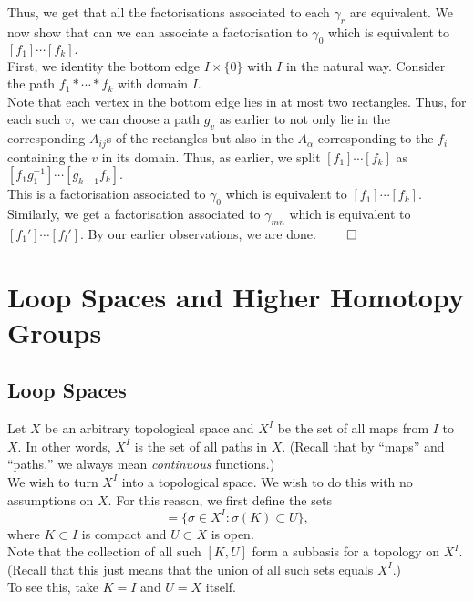 \documentclass[12pt]{article}
\begin{document}
	Thus, we get that all the factorisations associated to each $\gamma_r$ are equivalent. We now show that can we can associate a factorisation to $\gamma_0$ which is equivalent to $[f_1]\cdots[f_k].$\\
	First, we identity the bottom edge $I\times\{0\}$ with $I$ in the natural way. Consider the path $f_1*\cdots*f_k$ with domain $I.$\\
	Note that each vertex in the bottom edge lies in at most two rectangles. Thus, for each such $v,$ we can choose a path $g_v$ as earlier to not only lie in the corresponding $A_{ij}$s of the rectangles but also in the $A_\alpha$ corresponding to the $f_i$ containing the $v$ in its domain. Thus, as earlier, we split $[f_1]\cdots[f_k]$ as $[f_1g_1^{-1}]\cdots[g_{k-1}f_k].$\\
	This is a factorisation associated to $\gamma_0$ which is equivalent to $[f_1]\cdots[f_k].$\\
	Similarly, we get a factorisation associated to $\gamma_{mn}$ which is equivalent to $\allowbreak[f_1']\cdots[f_l'].$ By our earlier observations, we are done. \hfill $\qed$

%
%
%
%

\section{Loop Spaces and Higher Homotopy Groups}
\subsection{Loop Spaces}
Let $X$ be an arbitrary topological space and $X^I$ be the set of all maps from $I$ to $X.$ In other words, $X^I$ is the set of all paths in $X.$ (Recall that by ``maps'' and ``paths,'' we always mean \emph{continuous} functions.)\\
We wish to turn $X^I$ into a topological space. We wish to do this with no assumptions on $X.$ For this reason, we first define the sets
\begin{equation*} 
	[K, U] = \{\sigma \in X^I : \sigma(K) \subset U\},
\end{equation*}
where $K \subset I$ is compact and $U \subset X$ is open.\\
Note that the collection of all such $[K, U]$ form a subbasis for a topology on $X^I.$ (Recall that this just means that the union of all such sets equals $X^I.$)\\
To see this, take $K = I$ and $U = X$ itself.
\end{document}

